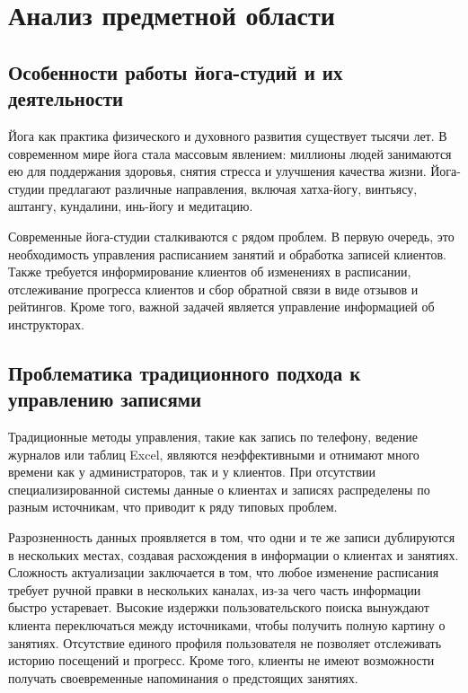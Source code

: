 \section{Анализ предметной области}

\subsection{Особенности работы йога-студий и их деятельности}

Йога как практика физического и духовного развития существует тысячи лет. В современном мире йога стала массовым явлением: миллионы людей занимаются ею для поддержания здоровья, снятия стресса и улучшения качества жизни. Йога-студии предлагают различные направления, включая хатха-йогу, винтьясу, аштангу, кундалини, инь-йогу и медитацию.

Современные йога-студии сталкиваются с рядом проблем. В первую очередь, это необходимость управления расписанием занятий и обработка записей клиентов. Также требуется информирование клиентов об изменениях в расписании, отслеживание прогресса клиентов и сбор обратной связи в виде отзывов и рейтингов. Кроме того, важной задачей является управление информацией об инструкторах.

\subsection{Проблематика традиционного подхода к управлению записями}

Традиционные методы управления, такие как запись по телефону, ведение журналов или таблиц Excel, являются неэффективными и отнимают много времени как у администраторов, так и у клиентов. При отсутствии специализированной системы данные о клиентах и записях распределены по разным источникам, что приводит к ряду типовых проблем.

Разрозненность данных проявляется в том, что одни и те же записи дублируются в нескольких местах, создавая расхождения в информации о клиентах и занятиях. Сложность актуализации заключается в том, что любое изменение расписания требует ручной правки в нескольких каналах, из-за чего часть информации быстро устаревает. Высокие издержки пользовательского поиска вынуждают клиента переключаться между источниками, чтобы получить полную картину о занятиях. Отсутствие единого профиля пользователя не позволяет отслеживать историю посещений и прогресс. Кроме того, клиенты не имеют возможности получать своевременные напоминания о предстоящих занятиях.

